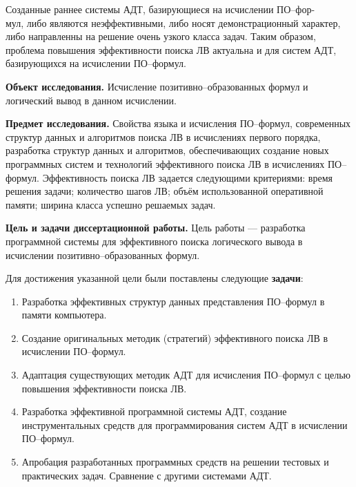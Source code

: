 \documentclass[a4paper]{report}
\begin{document}
Созданные раннее системы АДТ, базирующиеся на исчислении ПО--фор-\\мул, либо являются неэффективными, либо носят демонстрационный характер, либо направленны на решение очень узкого класса задач. Таким образом, проблема повышения эффективности поиска ЛВ актуальна и для систем АДТ, базирующихся на исчислении ПО--формул.

\textbf{Объект исследования.}
Исчисление позитивно--образованных формул и логический вывод в данном исчислении.

\textbf{Предмет исследования.}
Свойства языка и исчисления ПО--формул, современных структур данных и алгоритмов поиска ЛВ в исчислениях первого порядка, разработка структур данных и алгоритмов, обеспечивающих создание новых программных систем и технологий эффективного поиска ЛВ в исчислениях ПО--формул. Эффективность поиска ЛВ задается следующими критериями: время решения задачи; количество шагов ЛВ; объём использованной оперативной памяти; ширина класса успешно решаемых задач.

\textbf{Цель и задачи диссертационной работы.}
Цель работы --- разработка программной системы для эффективного поиска логического вывода в исчислении позитивно--образованных формул.

Для достижения указанной цели были поставлены следующие \textbf{задачи}:
\begin{enumerate}
\item Разработка эффективных структур данных представления ПО--формул в памяти компьютера.
\item Создание оригинальных методик (стратегий) эффективного поиска ЛВ в исчислении ПО--формул.
\item Адаптация существующих методик АДТ для исчисления ПО--формул с целью повышения эффективности поиска ЛВ.
\item Разработка эффективной программной системы АДТ, создание инструментальных средств для программирования систем АДТ в исчислении ПО--формул.
\item Апробация разработанных программных средств на решении тестовых и практических задач. Сравнение с другими системами АДТ.
\end{enumerate}
\end{document}
